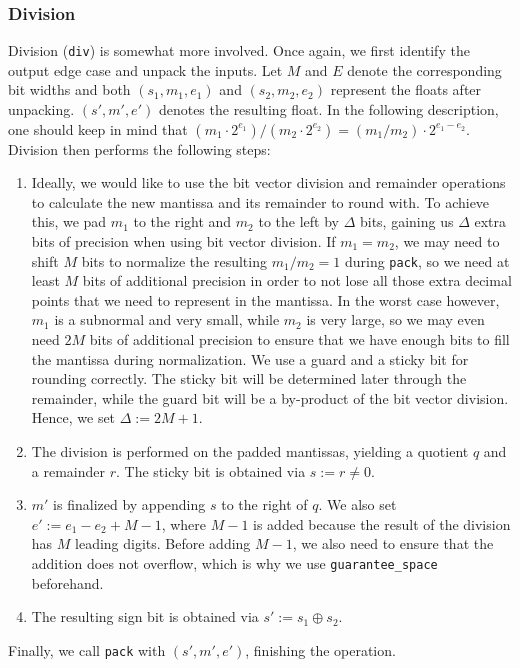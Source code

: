 \documentclass[a4paper,UKenglish,cleveref, autoref, thm-restate]{lipics-v2019}
\begin{document}
\subsubsection{Division}
Division (\verb|div|) is somewhat more involved. Once again, we first identify the output edge case and unpack the inputs. Let $M$ and $E$ denote the corresponding bit widths and both $(s_1, m_1, e_1)$ and $(s_2, m_2, e_2)$ represent the floats after unpacking. $(s', m', e')$ denotes the resulting float. In the following description, one should keep in mind that $(m_1 \cdot 2^{e_1}) / (m_2 \cdot 2^{e_2}) = (m_1 / m_2) \cdot 2^{e_1 - e_2}$.
Division then performs the following steps:
\begin{enumerate}
	\item Ideally, we would like to use the bit vector division and remainder operations to calculate the new mantissa and its remainder to round with. To achieve this, we pad $m_1$ to the right and $m_2$ to the left by $\Delta$ bits, gaining us $\Delta$ extra bits of precision when using bit vector division. If $m_1 = m_2$, we may need to shift $M$ bits to normalize the resulting $m_1 / m_2 = 1$ during \verb|pack|, so we need at least $M$ bits of additional precision in order to not lose all those extra decimal points that we need to represent in the mantissa. In the worst case however, $m_1$ is a subnormal and very small, while $m_2$ is very large, so we may even need $2M$ bits of additional precision to ensure that we have enough bits to fill the mantissa during normalization. We use a guard and a sticky bit for rounding correctly. The sticky bit will be determined later through the remainder, while the guard bit will be a by-product of the bit vector division. Hence, we set $\Delta := 2M + 1$.
	\item The division is performed on the padded mantissas, yielding a quotient $q$ and a remainder $r$. The sticky bit is obtained via $s := r \neq 0$.
	\item $m'$ is finalized by appending $s$ to the right of $q$. We also set $e' := e_1 - e_2 + M - 1$, where $M - 1$ is added because the result of the division has $M$ leading digits. Before adding $M - 1$, we also need to ensure that the addition does not overflow, which is why we use \verb|guarantee_space| beforehand.
	\item The resulting sign bit is obtained via $s' := s_1 \oplus s_2$.
\end{enumerate}
Finally, we call \verb|pack| with $(s', m', e')$, finishing the operation.
\end{document}
